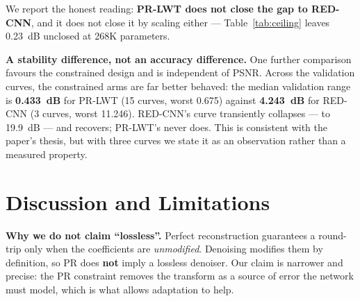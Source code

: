 \documentclass[conference]{IEEEtran}
\begin{document}
We report the honest reading: \textbf{PR-LWT does not close the gap to
RED-CNN}, and it does not close it by scaling either --- Table~\ref{tab:ceiling}
leaves 0.23~dB unclosed at 268K parameters.

\textbf{A stability difference, not an accuracy difference.} One further
comparison favours the constrained design and is independent of PSNR. Across the
validation curves, the constrained arms are far better behaved: the median
validation range is \textbf{0.433~dB} for PR-LWT (15 curves, worst 0.675) against
\textbf{4.243~dB} for RED-CNN (3 curves, worst 11.246). RED-CNN's curve
transiently collapses --- to 19.9~dB --- and recovers; PR-LWT's never does. This
is consistent with the paper's thesis, but with three curves we state it as an
observation rather than a measured property.

\section{Discussion and Limitations}

\textbf{Why we do not claim ``lossless''.} Perfect reconstruction guarantees a
round-trip only when the coefficients are \emph{unmodified}. Denoising modifies
them by definition, so PR does \textbf{not} imply a lossless denoiser. Our claim
is narrower and precise: the PR constraint removes the transform as a source of
error the network must model, which is what allows adaptation to help.
\end{document}
